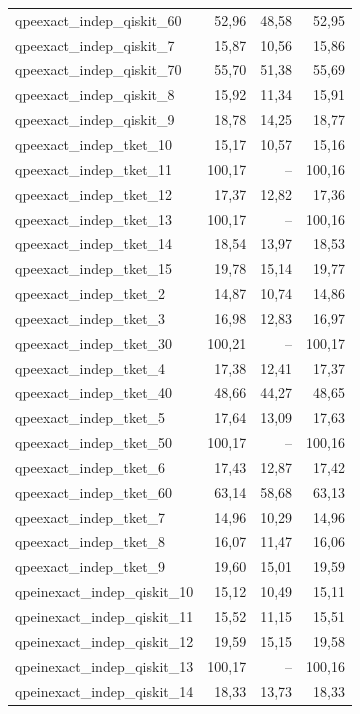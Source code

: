 \begin{longtable}{lrrr}
qpeexact\_indep\_qiskit\_60 & 52,96 & 48,58 & 52,95 \\
qpeexact\_indep\_qiskit\_7 & 15,87 & 10,56 & 15,86 \\
qpeexact\_indep\_qiskit\_70 & 55,70 & 51,38 & 55,69 \\
qpeexact\_indep\_qiskit\_8 & 15,92 & 11,34 & 15,91 \\
qpeexact\_indep\_qiskit\_9 & 18,78 & 14,25 & 18,77 \\
qpeexact\_indep\_tket\_10 & 15,17 & 10,57 & 15,16 \\
qpeexact\_indep\_tket\_11 & 100,17 & -- & 100,16 \\
qpeexact\_indep\_tket\_12 & 17,37 & 12,82 & 17,36 \\
qpeexact\_indep\_tket\_13 & 100,17 & -- & 100,16 \\
qpeexact\_indep\_tket\_14 & 18,54 & 13,97 & 18,53 \\
qpeexact\_indep\_tket\_15 & 19,78 & 15,14 & 19,77 \\
qpeexact\_indep\_tket\_2 & 14,87 & 10,74 & 14,86 \\
qpeexact\_indep\_tket\_3 & 16,98 & 12,83 & 16,97 \\
qpeexact\_indep\_tket\_30 & 100,21 & -- & 100,17 \\
qpeexact\_indep\_tket\_4 & 17,38 & 12,41 & 17,37 \\
qpeexact\_indep\_tket\_40 & 48,66 & 44,27 & 48,65 \\
qpeexact\_indep\_tket\_5 & 17,64 & 13,09 & 17,63 \\
qpeexact\_indep\_tket\_50 & 100,17 & -- & 100,16 \\
qpeexact\_indep\_tket\_6 & 17,43 & 12,87 & 17,42 \\
qpeexact\_indep\_tket\_60 & 63,14 & 58,68 & 63,13 \\
qpeexact\_indep\_tket\_7 & 14,96 & 10,29 & 14,96 \\
qpeexact\_indep\_tket\_8 & 16,07 & 11,47 & 16,06 \\
qpeexact\_indep\_tket\_9 & 19,60 & 15,01 & 19,59 \\
qpeinexact\_indep\_qiskit\_10 & 15,12 & 10,49 & 15,11 \\
qpeinexact\_indep\_qiskit\_11 & 15,52 & 11,15 & 15,51 \\
qpeinexact\_indep\_qiskit\_12 & 19,59 & 15,15 & 19,58 \\
qpeinexact\_indep\_qiskit\_13 & 100,17 & -- & 100,16 \\
qpeinexact\_indep\_qiskit\_14 & 18,33 & 13,73 & 18,33 \\

\end{longtable}
